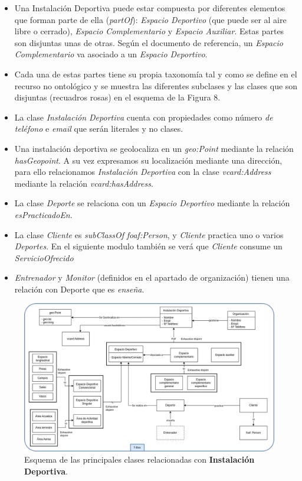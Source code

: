 \documentclass[a4paper,12pt]{article}
\begin{document}
	\begin{itemize}
		\item Una Instalación Deportiva puede estar compuesta por diferentes elementos que forman parte de ella (\textit{partOf}): \textit{Espacio Deportivo} (que puede ser al aire libre o cerrado), \textit{Espacio Complementario} y \textit{Espacio Auxiliar}. Estas partes son disjuntas unas de otras. Según el documento de referencia, un \textit{Espacio Complementario} va asociado a un \textit{Espacio Deportivo}.
		\item Cada una de estas partes tiene su propia taxonomía tal y como se define en el recurso no ontológico y se muestra las diferentes subclases y las clases que son disjuntas (recuadros rosas) en el esquema de la Figura 8.
		\item La clase \textit{Instalación Deportiva} cuenta con propiedades como número\textit{ de teléfono} e \textit{email} que serán literales y no clases.
		\item Una instalación deportiva se geolocaliza en un \textit{geo:Point} mediante la relación \textit{hasGeopoint}. A su vez expresamos su localización mediante una dirección, para ello relacionamos \textit{Instalación Deportiva} con la clase \textit{vcard:Address} mediante la relación \textit{vcard:hasAddress}.
		\item La clase \textit{Deporte} se relaciona con un \textit{Espacio Deportivo} mediante la relación \textit{esPracticadoEn}.
		\item La clase \textit{Cliente} es \textit{subClassOf} \textit{foaf:Person}, y \textit{Cliente} practica uno o varios \textit{Deportes}. En el siguiente modulo también se verá que \textit{Cliente} consume un \textit{ServicioOfrecido}
		\item \textit{Entrenador} y \textit{Monitor} (definidos en el apartado de organización) tienen una relación con Deporte que es \textit{enseña}.
	\end{itemize}

	\begin{figure}[H]
		\centering
		\includegraphics[width=\textwidth]{include/tbox.png}
		\caption{Esquema de las principales clases relacionadas con \textbf{Instalación Deportiva}.}
	\end{figure}
		
\end{document}
